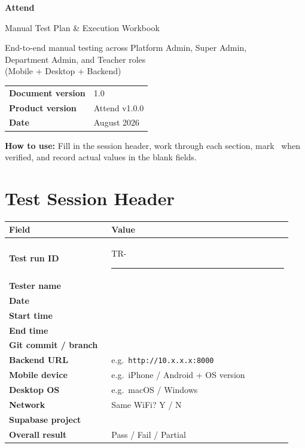 \documentclass[11pt,a4paper,oneside]{article}
\makeatletter
\newcommand{\chk}{\fbox{\rule{0pt}{1.05ex}\rule{1.05ex}{0pt}}}
\newenvironment{fieldtable}{%
  \smallskip\small
\begin{tabular}{@{}>{\raggedright\arraybackslash}p{0.34\linewidth} >{\raggedright\arraybackslash}p{0.60\linewidth}@{}}
  \toprule
  \textbf{Field} & \textbf{Value} \\
  \midrule
}{%
  \bottomrule
  \end{tabular}
  \smallskip
}
\makeatother
\begin{document}
\begin{titlepage}
  \centering
  \vspace*{1.5cm}
  {\Huge\bfseries\color{AttendPrimary} Attend\par}
  \vspace{0.4cm}
  {\LARGE Manual Test Plan \& Execution Workbook\par}
  \vspace{1.2cm}
  {\large\color{AttendGray}
    End-to-end manual testing across Platform Admin, Super Admin,\\
    Department Admin, and Teacher roles\\
    (Mobile + Desktop + Backend)\par}
  \vfill
\begin{tabular}{@{}ll@{}}
    \textbf{Document version} & 1.0 \\
    \textbf{Product version}  & Attend v1.0.0 \\
    \textbf{Date}             & August 2026 \\
  \end{tabular}
  \vspace{1.5cm}
\end{titlepage}

\tableofcontents
\clearpage
{}

\noindent
\textbf{How to use:} Fill in the session header, work through each section, mark \chk\ when verified, and record actual values in the blank fields.

\section{Test Session Header}

\begin{fieldtable}
\textbf{Test run ID}         & TR-\rule{4cm}{0.4pt} \\
\textbf{Tester name}        & \\
\textbf{Date}               & \\
\textbf{Start time}         & \\
\textbf{End time}           & \\
\textbf{Git commit / branch}& \\
\textbf{Backend URL}        & e.g.\ \texttt{http://10.x.x.x:8000} \\
\textbf{Mobile device}      & e.g.\ iPhone / Android + OS version \\
\textbf{Desktop OS}         & e.g.\ macOS / Windows \\
\textbf{Network}            & Same WiFi? Y / N \\
\textbf{Supabase project}   & \\
\textbf{Overall result}     & Pass / Fail / Partial \\
\end{fieldtable}
\end{document}
